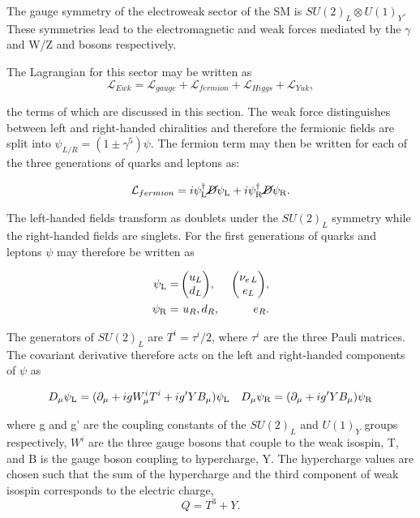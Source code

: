 The gauge symmetry of the electroweak sector of the SM is $SU(2)_L\otimes U(1)_Y$. These symmetries lead
to the electromagnetic and weak forces mediated by the $\gamma$ and W/Z and bosons respectively.

The Lagrangian for this sector may be written as
\begin{equation}
\mathcal{L}_{Ewk} = \mathcal{L}_{gauge} + \mathcal{L}_{fermion} + \mathcal{L}_{Higgs} + \mathcal{L}_{Yuk},
\end{equation}

the terms of which are discussed in this section. The weak force distinguishes
between left and right-handed chiralities and therefore the fermionic fields are split into
$\psi_{L/R} = (1\pm\gamma^5)\psi$. The fermion term may then be written for each of the 
three generations of quarks and leptons as:

\begin{equation}
\mathcal{L}_{fermion} = i \psi_{\mathrm{L}}^{\dagger}\cancel{D}\psi_{\mathrm{L}} + i \psi_{\mathrm{R}}^{\dagger}\cancel{D}\psi_{\mathrm{R}}.
\end{equation}

The left-handed fields transform as doublets under the $SU(2)_L$ symmetry
while the right-handed fields are singlets.
For the first generations of quarks and leptons $\psi$ may therefore be written as

\begin{align}
\qquad\qquad\qquad\psi_{\mathrm{L}} =\,&{\begin{pmatrix} u_L \\ d_L \end{pmatrix}},\, &{\begin{pmatrix} \nu_{e\,L} \\ e_L \end{pmatrix}},\nonumber\qquad\qquad\qquad\\
\qquad\qquad\qquad\psi_{\mathrm{R}} = \,&\,u_R,d_R,\, &\,e_R.\qquad\qquad\qquad
\end{align}

The generators of $SU(2)_L$ are $T^i = \tau^i/2$, where $\tau^i$ are the three Pauli matrices. 
The covariant derivative therefore acts on the left and right-handed components of $\psi$ as

\begin{equation}
D_{\mu} \psi_{\mathrm{L}} = (\partial_\mu + igW^i_{\mu}T^i + ig'YB_\mu)\psi_{\mathrm{L}} \quad D_{\mu} \psi_{\mathrm{R}} = (\partial_\mu + ig'YB_\mu)\psi_{\mathrm{R}}
\end{equation}

where g and g' are the coupling constants of the $SU(2)_L$ and $U(1)_Y$ groups respectively, 
$W^i$ are the three gauge bosons that couple to the weak isospin, T, and B is the gauge boson
coupling to hypercharge, Y. The hypercharge values are chosen such that the sum of the hypercharge and 
the third component of weak isospin corresponds to the electric charge,
\begin{equation}
\label{equ:charge}
Q = T^{3} + Y.
\end{equation}

